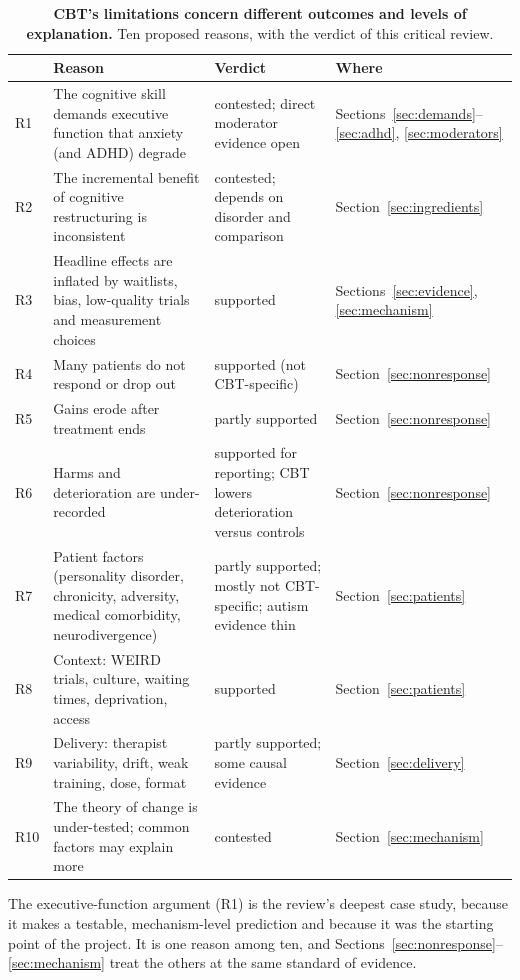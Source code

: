\begin{table}[!tp]
\centering\small
\renewcommand{\arraystretch}{1.15}\begin{tabular}{@{}p{}>{\raggedright\arraybackslash}p{}>{\raggedright\arraybackslash}p{}>{\raggedright\arraybackslash}p{}@{}}
\toprule
 & Reason & Verdict & Where \\ \midrule
R1 & The cognitive skill demands executive function that anxiety (and ADHD) degrade & contested; direct moderator evidence open & Sections~\ref{sec:demands}--\ref{sec:adhd}, \ref{sec:moderators} \\
R2 & The incremental benefit of cognitive restructuring is inconsistent & contested; depends on disorder and comparison & Section~\ref{sec:ingredients} \\
R3 & Headline effects are inflated by waitlists, bias, low-quality trials and measurement choices & supported & Sections~\ref{sec:evidence}, \ref{sec:mechanism} \\
R4 & Many patients do not respond or drop out & supported (not CBT-specific) & Section~\ref{sec:nonresponse} \\
R5 & Gains erode after treatment ends & partly supported & Section~\ref{sec:nonresponse} \\
R6 & Harms and deterioration are under-recorded & supported for reporting; CBT lowers deterioration versus controls & Section~\ref{sec:nonresponse} \\
R7 & Patient factors (personality disorder, chronicity, adversity, medical comorbidity, neurodivergence) & partly supported; mostly not CBT-specific; autism evidence thin & Section~\ref{sec:patients} \\
R8 & Context: WEIRD trials, culture, waiting times, deprivation, access & supported & Section~\ref{sec:patients} \\
R9 & Delivery: therapist variability, drift, weak training, dose, format & partly supported; some causal evidence & Section~\ref{sec:delivery} \\
R10 & The theory of change is under-tested; common factors may explain more & contested & Section~\ref{sec:mechanism} \\ \bottomrule
\end{tabular}
\vspace{4pt}\caption{\textbf{CBT's limitations concern different outcomes and levels of explanation.} Ten proposed reasons, with the verdict of this critical review.}\label{tab:reasons}
\end{table}

The executive-function argument (R1) is the review's deepest case study, because it makes a testable, mechanism-level prediction and because it was the starting point of the project.
It is one reason among ten, and Sections~\ref{sec:nonresponse}--\ref{sec:mechanism} treat the others at the same standard of evidence.
